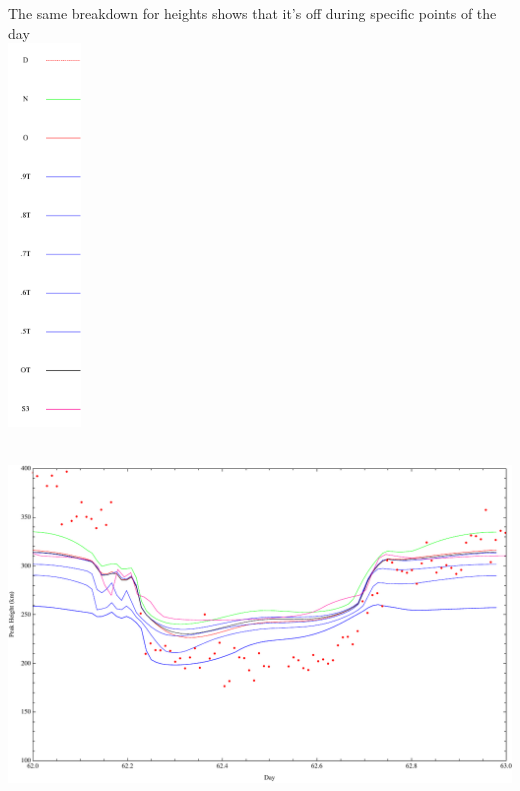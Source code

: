 \documentclass[12pt]{IEEEtran}
\begin{document}
    The same breakdown for heights shows that it's off during specific points of the day  \\
    \includegraphics[height=4in]{legend}
    \includegraphics[height=4in]{hm}
    \clearpage
\end{document}
